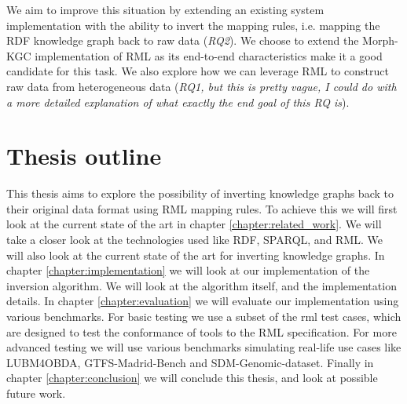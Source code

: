 We aim to improve this situation by extending an existing system implementation with the ability to invert the mapping rules, i.e. mapping the RDF knowledge graph back to raw data (\textit{RQ2}). We choose to extend the Morph-KGC implementation \citep{arenas2022morph} of RML \citep{dimou_ldow_2014} as its end-to-end characteristics make it a good candidate for this task. 
We also explore how we can leverage RML to construct raw data from heterogeneous data (\textit{RQ1, but this is pretty vague, I could do with a more detailed explanation of what exactly the end goal of this RQ is}). 


\section{Thesis outline}
This thesis aims to explore the possibility of inverting knowledge graphs back to their original data format using RML mapping rules. To achieve this we will first look at the current state of the art in chapter \ref{chapter:related_work}. We will take a closer look at the technologies used like RDF, SPARQL, and RML. We will also look at the current state of the art for inverting knowledge graphs. In chapter \ref{chapter:implementation} we will look at our implementation of the inversion algorithm. We will look at the algorithm itself, and the implementation details. In chapter \ref{chapter:evaluation} we will evaluate our implementation using various benchmarks. For basic testing we use a subset of the rml test cases, which are designed to test the conformance of tools to the RML specification. For more advanced testing we will use various benchmarks simulating real-life use cases like LUBM4OBDA, GTFS-Madrid-Bench and SDM-Genomic-dataset. Finally in chapter \ref{chapter:conclusion} we will conclude this thesis, and look at possible future work.


